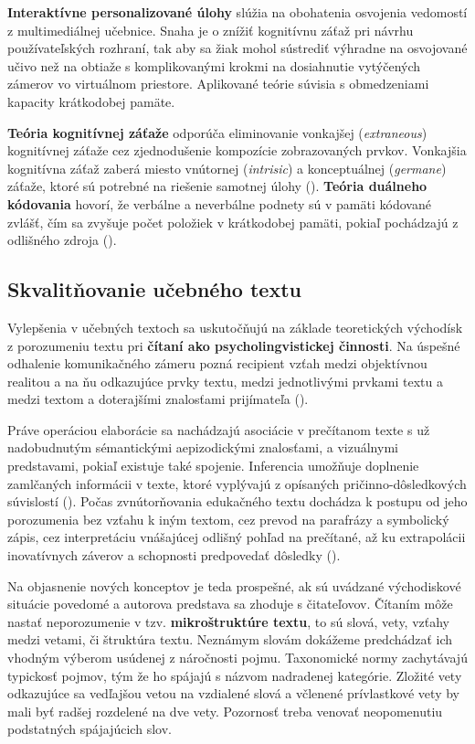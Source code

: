 \textbf{Interaktívne personalizované úlohy} slúžia na obohatenia osvojenia vedomostí z multimediálnej učebnice. Snaha je o znížiť kognitívnu záťaž pri návrhu používateľských rozhraní, tak aby sa žiak mohol sústrediť výhradne na osvojované učivo než na obtiaže s komplikovanými krokmi na dosiahnutie vytýčených zámerov vo virtuálnom priestore. Aplikované teórie súvisia s obmedzeniami kapacity krátkodobej pamäte. 

\textbf{Teória kognitívnej záťaže} odporúča eliminovanie vonkajšej (\emph{extraneous}) kognitívnej záťaže cez zjednodušenie kompozície zobrazovaných prvkov. Vonkajšia kognitívna záťaž zaberá miesto vnútornej (\emph{intrisic}) a konceptuálnej (\emph{germane}) záťaže, ktoré sú potrebné na riešenie samotnej úlohy (\cite{uhercik_vyznam_2012}). \textbf{Teória duálneho kódovania} hovorí, že verbálne a neverbálne podnety sú v pamäti kódované zvlášť, čím sa zvyšuje počet položiek v krátkodobej pamäti, pokiaľ pochádzajú z odlišného zdroja (\cite{mishra_interactive_2005}).

\subsection{Skvalitňovanie učebného textu}
Vylepšenia v učebných textoch sa uskutočňujú na základe teoretických východísk z porozumeniu textu pri \textbf{čítaní ako psycholingvistickej činnosti}. Na úspešné odhalenie komunikačného zámeru pozná recipient vzťah medzi objektívnou realitou a na ňu odkazujúce prvky textu, medzi jednotlivými prvkami textu a medzi textom a doterajšími znalosťami prijímateľa (\cite{gavora_ziak_1992}). 

Práve operáciou elaborácie sa nachádzajú asociácie v prečítanom texte s už nadobudnutým sémantickými aepizodickými znalosťami, a vizuálnymi predstavami, pokiaľ existuje také spojenie. Inferencia umožňuje doplnenie zamlčaných informácii v texte, ktoré vyplývajú z opísaných pričinno-dôsledkových súvislostí (\cite{gavora_ziak_1992}). Počas zvnútorňovania edukačného textu dochádza k postupu od jeho porozumenia bez vzťahu k iným textom, cez prevod na parafrázy a symbolický zápis, cez interpretáciu vnášajúcej odlišný pohľad na prečítané, až ku extrapolácii inovatívnych záverov a schopnosti predpovedať dôsledky (\cite{gavora_ziak_1992}). 

Na objasnenie nových konceptov je teda prospešné, ak sú uvádzané východiskové situácie povedomé a autorova predstava sa zhoduje s čitateľovov. Čítaním môže nastať neporozumenie v tzv. \textbf{mikroštruktúre textu}, to sú slová, vety, vzťahy medzi vetami, či štruktúra textu. Neznámym slovám dokážeme predchádzať ich vhodným výberom usúdenej z náročnosti pojmu. Taxonomické normy zachytávajú typickosť pojmov, tým že ho spájajú s názvom nadradenej kategórie. Zložité vety odkazujúce sa vedľajšou vetou na vzdialené slová a včlenené prívlastkové vety by mali byť radšej rozdelené na dve vety. Pozornosť treba venovať neopomenutiu podstatných spájajúcich slov. 

